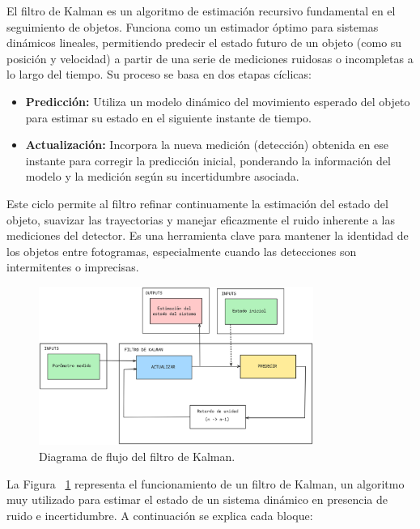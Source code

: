 \documentclass[11pt,spanish,listoffigures,listoftables]{tfgetsinf}
\begin{document}
El filtro de Kalman es un algoritmo de estimación recursivo fundamental en el seguimiento de objetos. Funciona como un estimador óptimo para sistemas dinámicos lineales, permitiendo predecir el estado futuro de un objeto (como su posición y velocidad) a partir de una serie de mediciones ruidosas o incompletas a lo largo del tiempo. Su proceso se basa en dos etapas cíclicas:
\begin{itemize}
   \item \textbf{Predicción:} Utiliza un modelo dinámico del movimiento esperado del objeto para estimar su estado en el siguiente instante de tiempo.
   \item \textbf{Actualización:} Incorpora la nueva medición (detección) obtenida en ese instante para corregir la predicción inicial, ponderando la información del modelo y la medición según su incertidumbre asociada.
\end{itemize}
Este ciclo permite al filtro refinar continuamente la estimación del estado del objeto, suavizar las trayectorias y manejar eficazmente el ruido inherente a las mediciones del detector. Es una herramienta clave para mantener la identidad de los objetos entre fotogramas, especialmente cuando las detecciones son intermitentes o imprecisas.



\begin{figure}[H]
   \centering
   \includegraphics[width=0.8\textwidth]{images/estado_del_arte/filtro_de_kalman.png}
   \caption{Diagrama de flujo del filtro de Kalman.}
   \label{fig:filtro_de_kalman}
\end{figure}

La Figura ~\ref{fig:filtro_de_kalman} representa el funcionamiento de un filtro de Kalman, un algoritmo muy utilizado para estimar el estado de un sistema dinámico en presencia de ruido e incertidumbre. A continuación se explica cada bloque:
\end{document}
